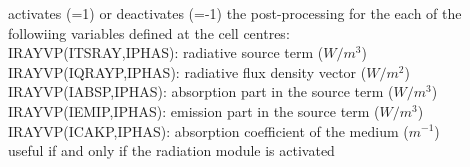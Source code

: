 {activates (=1) or deactivates (=-1) the post-processing for the each of the
followiing variables defined at the cell centres:\\
\hspace*{1.3cm} IRAYVP(ITSRAY,IPHAS): radiative source term ($W/m^3$)\\
\hspace*{1.3cm} IRAYVP(IQRAYP,IPHAS): radiative flux density vector ($W/m^2$)\\
\hspace*{1.3cm} IRAYVP(IABSP,IPHAS): absorption part in the source term
($W/m^3$)\\ 
\hspace*{1.3cm} IRAYVP(IEMIP,IPHAS): emission part in the source term
($W/m^3$)\\ 
\hspace*{1.3cm} IRAYVP(ICAKP,IPHAS): absorption coefficient of the
medium ($m^{-1}$)\\ 
useful if and only if the radiation module is activated}

